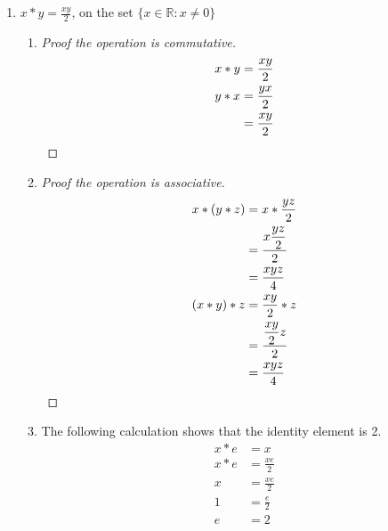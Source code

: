\documentclass[draft,twoside]{amsart}
\newcommand{\Reals}{\mathbb{R}{}}
\begin{document}
\begin{enumerate}
\begin{enumerate}
      We know by commuativity that $x * (-k) = (-k) * x$. Therefore,
      $-k$ is the identity element.

      \item We can caluclate the inverse of $x$ which we label $x'$.
      \begin{align*}
         x * x' & = -k          \\
	 x * x' & = x + x' + k  \\
	    -k  & = x + x' + k  \\
	     x' & = -x - 2k
      \end{align*}

   \end{enumerate}

   \item $\displaystyle x * y = \frac{xy}{2}$, on the set $\{x \in \Reals
   : x \ne 0\}$
   
      \begin{enumerate}
         \item
	 \begin{proof}[Proof the operation is commutative]
	    \begin{align*}
	       x * y & = \frac{xy}{2}         \\
               y * x & = \frac{yx}{2}         \\
	             & = \frac{xy}{2} \qedhere
	    \end{align*}
	 \end{proof}

	 \item
	 \begin{proof}[Proof the operation is associative]
	    \begin{align*}
	       x * (y * z) & = x * \frac{yz}{2}   \\
	                   & = \frac{x\displaystyle\frac{yz}{2}}{2} \\
			   & = \frac{xyz}{4} \\
	       (x * y) * z & = \frac{xy}{2} * z \\
	                   & = \frac{\displaystyle \frac{xy}{2}z}{2} \\
			   & = \frac{xyz}{4} \qedhere
	    \end{align*}
	 \end{proof}

	 \item The following calculation shows that the identity element
	 is 2.
	 \begin{align*}
	    x * e & = x              \\
	    x * e & = \frac{xe}{2}   \\
	        x & = \frac{xe}{2}   \\
		1 & = \frac{e}{2}    \\
		e & = 2
	 \end{align*}


\end{enumerate}
\end{enumerate}
\end{document}
